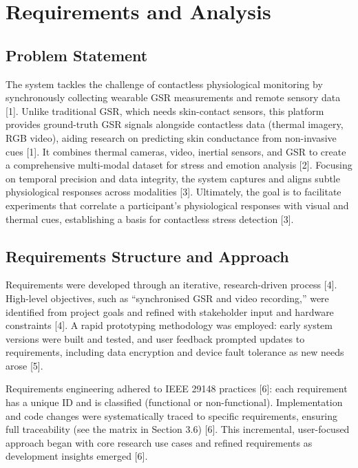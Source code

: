 
\chapter{Requirements and Analysis}
\label{ch:requirements}

\section{Problem Statement}

The system tackles the challenge of contactless physiological monitoring by synchronously collecting wearable GSR measurements and remote sensory data [1]. Unlike traditional GSR, which needs skin-contact sensors, this platform provides ground-truth GSR signals alongside contactless data (thermal imagery, RGB video), aiding research on predicting skin conductance from non-invasive cues [1]. It combines thermal cameras, video, inertial sensors, and GSR to create a comprehensive multi-modal dataset for stress and emotion analysis [2]. Focusing on temporal precision and data integrity, the system captures and aligns subtle physiological responses across modalities [3]. Ultimately, the goal is to facilitate experiments that correlate a participant's physiological responses with visual and thermal cues, establishing a basis for contactless stress detection [3].

\section{Requirements Structure and Approach}

Requirements were developed through an iterative, research-driven process [4]. High-level objectives, such as “synchronised GSR and video recording,” were identified from project goals and refined with stakeholder input and hardware constraints [4]. A rapid prototyping methodology was employed: early system versions were built and tested, and user feedback prompted updates to requirements, including data encryption and device fault tolerance as new needs arose [5].

Requirements engineering adhered to IEEE 29148 practices [6]: each requirement has a unique ID and is classified (functional or non-functional). Implementation and code changes were systematically traced to specific requirements, ensuring full traceability (see the matrix in Section 3.6) [6]. This incremental, user-focused approach began with core research use cases and refined requirements as development insights emerged [6].

